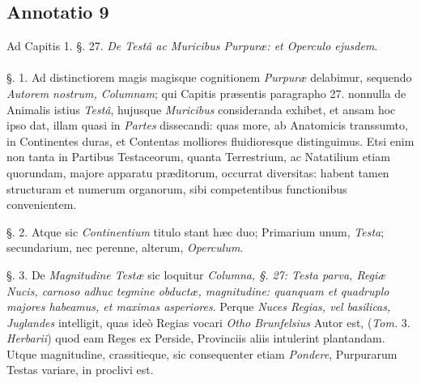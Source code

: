 \documentclass[a4paper, 11pt, oneside, polutonikogreek, german]{article}
\begin{document}
\subsection{Annotatio 9}
\begin{center}
Ad Capitis 1. §. 27. \emph{De Testâ ac Muricibus Purpuræ: et Operculo ejusdem}.
\end{center}
\paragraph{}
§. 1. Ad distinctiorem magis magisque cognitionem \emph{Purpuræ} delabimur, sequendo \emph{Autorem nostrum, Columnam}; qui Capitis præsentis paragrapho 27. nonnulla de Animalis istius \emph{Testâ}, hujusque \emph{Muricibus} consideranda exhibet, et ansam hoc ipso dat, illam quasi in \emph{Partes} dissecandi: quas more, ab Anatomicis transsumto, in Continentes duras, et Contentas molliores fluidioresque distinguimus. Etsi enim non tanta in Partibus Testaceorum, quanta Terrestrium, ac Natatilium etiam quorundam, majore apparatu præditorum, occurrat diversitas: habent tamen structuram et numerum organorum, sibi competentibus functionibus convenientem.

§. 2. Atque sic \emph{Continentium} titulo stant hæc duo; Primarium unum, \emph{Testa}; secundarium, nec perenne, alterum, \emph{Operculum}.

§. 3. De \emph{Magnitudine Testæ} sic loquitur \emph{Columna, §. 27: Testa parva, Regiæ Nucis, carnoso adhuc tegmine obductæ, magnitudine: quanquam et quadruplo majores habeamus, et maximas asperiores}. Perque \emph{Nuces Regias, vel basilicas, Juglandes} intelligit, quas ideò Regias vocari \emph{Otho Brunfelsius} Autor est, (\emph{Tom.} 3. \emph{Herbarii}) quod eam Reges ex Perside, Provinciis aliis intulerint plantandam. Utque magnitudine, crassitieque, sic consequenter etiam \emph{Pondere}, Purpurarum Testas variare, in proclivi est.
\end{document}

